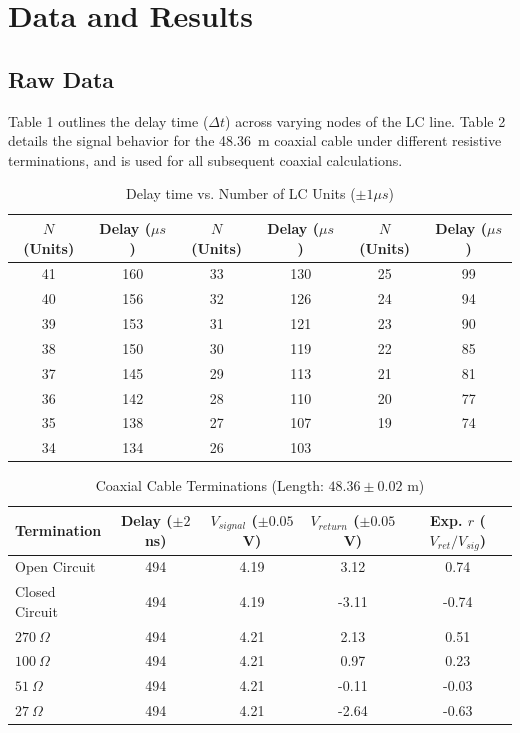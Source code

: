 \documentclass[11pt, letterpaper]{article}
\begin{document}
\section{Data and Results}

\subsection{Raw Data}
Table 1 outlines the delay time ($\Delta t$) across varying nodes of the LC line. Table 2 details the signal behavior for the \qty{48.36}{m} coaxial cable under different resistive terminations, and is used for all subsequent coaxial calculations.

\begin{table}[H]
\centering
\caption{Delay time vs. Number of LC Units ($\pm 1 \mu s$)}
\begin{tabular}{cc|cc|cc}
\toprule
$N$ (Units) & Delay ($\mu s$) & $N$ (Units) & Delay ($\mu s$) & $N$ (Units) & Delay ($\mu s$) \\ \midrule
41 & 160 & 33 & 130 & 25 & 99 \\
40 & 156 & 32 & 126 & 24 & 94 \\
39 & 153 & 31 & 121 & 23 & 90 \\
38 & 150 & 30 & 119 & 22 & 85 \\
37 & 145 & 29 & 113 & 21 & 81 \\
36 & 142 & 28 & 110 & 20 & 77 \\
35 & 138 & 27 & 107 & 19 & 74 \\
34 & 134 & 26 & 103 &    &    \\ \bottomrule
\end{tabular}
\end{table}

\begin{table}[H]
\centering
\caption{Coaxial Cable Terminations (Length: $48.36 \pm 0.02$ m)}
\begin{tabular}{lcccc}
\toprule
Termination & Delay ($\pm 2$ ns) & $V_{signal}$ ($\pm 0.05$ V) & $V_{return}$ ($\pm 0.05$ V) & Exp. $r$ ($V_{ret}/V_{sig}$)\\ \midrule
Open Circuit & 494 & 4.19 & 3.12 & 0.74 \\
Closed Circuit & 494 & 4.19 & -3.11 & -0.74 \\
$270\ \Omega$ & 494 & 4.21 & 2.13 & 0.51 \\
$100\ \Omega$ & 494 & 4.21 & 0.97 & 0.23 \\
$51\ \Omega$ & 494 & 4.21 & -0.11 & -0.03 \\
$27\ \Omega$ & 494 & 4.21 & -2.64 & -0.63 \\ \bottomrule
\end{tabular}
\end{table}
\end{document}
